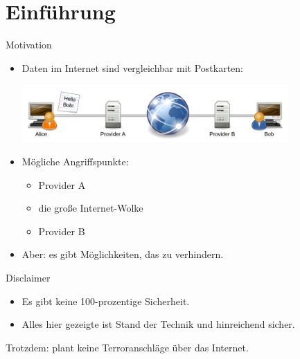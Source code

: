 \documentclass{beamer}
\begin{document}
\section{Einführung}
\begin{frame}{Motivation}
\begin{itemize}
	\item Daten im Internet sind vergleichbar mit Postkarten: \\
		\vfill
		\begin{center}
			\includegraphics[width=0.8\textwidth]{no-crypto.pdf}
		\end{center}
	\pause
	\vfill
	\item Mögliche Angriffspunkte:
		\begin{itemize}
			\item Provider A
			\item die große Internet-Wolke
			\item Provider B
		\end{itemize}
	\pause
	\vfill
	\item Aber: es gibt Möglichkeiten, das zu verhindern.
\end{itemize}
\end{frame}

\begin{frame}
\begin{block}{Disclaimer}
	\begin{itemize}
		\item Es gibt keine 100-prozentige Sicherheit.
		\item Alles hier gezeigte ist Stand der Technik und hinreichend sicher.
	\end{itemize}

	Trotzdem: plant keine Terroranschläge über das Internet.
\end{block}
\end{frame}
\end{document}
